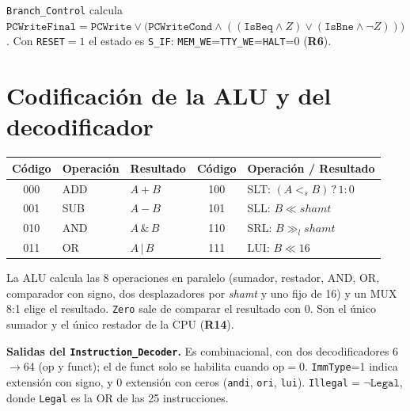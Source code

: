 \documentclass[10pt,a4paper]{article}
\newcommand{\s}[1]{\texttt{#1}}
\begin{document}
\noindent \s{Branch\_Control} calcula
$\s{PCWriteFinal}=\s{PCWrite}\lor\big(\s{PCWriteCond}\land((\s{IsBeq}\land Z)\lor(\s{IsBne}\land\lnot Z))\big)$.
Con \s{RESET}$=1$ el estado es \s{S\_IF}: \s{MEM\_WE}=\s{TTY\_WE}=\s{HALT}=0 (\textbf{R6}).

\section{Codificación de la ALU y del decodificador}

\begin{center}\small
\begin{tabular}{@{}cllcl@{}}
\toprule
Código & Operación & Resultado & Código & Operación / Resultado \\
\midrule
000 & ADD & $A+B$ & 100 & SLT: $(A<_s B)\,?\,1:0$ \\
001 & SUB & $A-B$ & 101 & SLL: $B \ll \mathit{shamt}$ \\
010 & AND & $A\,\&\,B$ & 110 & SRL: $B \gg_l \mathit{shamt}$ \\
011 & OR  & $A\,|\,B$ & 111 & LUI: $B \ll 16$ \\
\bottomrule
\end{tabular}
\end{center}

\noindent La ALU calcula las 8 operaciones en paralelo (sumador, restador, AND, OR,
comparador con signo, dos desplazadores por \textit{shamt} y uno fijo de 16) y un MUX 8:1
elige el resultado. \s{Zero} sale de comparar el resultado con 0. Son el único sumador y el
único restador de la CPU (\textbf{R14}).

\medskip
\noindent\textbf{Salidas del \s{Instruction\_Decoder}.} Es combinacional, con dos
decodificadores 6$\to$64 (op y funct); el de funct solo se habilita cuando op$=0$.
\s{ImmType}=1 indica extensión con signo, y 0 extensión con ceros (\s{andi}, \s{ori}, \s{lui}).
\s{Illegal}$=\lnot\s{Legal}$, donde \s{Legal} es la OR de las 25 instrucciones.
\end{document}
